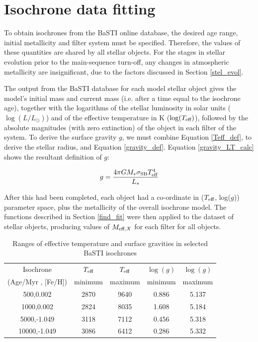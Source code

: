 \documentclass[12pt, a4paper]{report}
\begin{document}
\section{Isochrone data fitting}
To obtain isochrones from the BaSTI online database, the desired age range, initial metallicity and filter system must be specified. Therefore, the values of these quantities are shared by all stellar objects. For the stages in stellar evolution prior to the main-sequence turn-off, any changes in atmospheric metallicity are insignificant, due to the factors discussed in Section \ref{stel_evol}.

The output from the BaSTI database for each model stellar object gives the model's initial mass and current mass (i.e. after a time equal to the isochrone age), together with the logarithms of the stellar luminosity in solar units ($\log(L/L_{\odot})$) and of the effective temperature in K ($\log(T_{\textnormal{eff}})$), followed by the absolute magnitudes (with zero extinction) of the object in each filter of the system. To derive the surface gravity $g$, we must combine Equation \ref{Teff_def}, to derive the stellar radius, and Equation \ref{gravity_def}. Equation \ref{gravity_LT_calc} shows the resultant definition of $g$:

\begin{equation}
\label{gravity_LT_calc}
g = \frac{4 \pi G M_{*} \sigma_{\textnormal{SB}} T_{\textnormal{eff}}^{4}}{L_{*}}
\end{equation}

After this had been completed, each object had a co-ordinate in ($T_{\textnormal{eff}}$, log($g$)) parameter space, plus the metallicity of the overall isochrone model. The functions described in Section \ref{find_fit} were then applied to the dataset of stellar objects, producing values of $M_{\textnormal{eff},X}$ for each filter for all objects.

\begin{table}
\begin{center}
\begin{tabular}{ccccc}
\hline
Isochrone & $T_{\textnormal{eff}}$ & $T_{\textnormal{eff}}$ & $\log(g)$ & $\log(g)$ \\
(Age/Myr , [Fe/H]) & minimum & maximum & minimum & maximum \\
\hline
500,0.002 & 2870 & 9640 & 0.886 & 5.137 \\
1000,0.002 & 2824 & 8035 & 1.608 & 5.184 \\
5000,-1.049 & 3118 & 7112 & 0.456 & 5.318 \\
10000,-1.049 & 3086 & 6412 & 0.286 & 5.332 \\
\hline
\end{tabular}
\caption{Ranges of effective temperature and surface gravities in selected BaSTI isochrones}
\label{variable_ranges}
\end{center}
\end{table}
\end{document}
